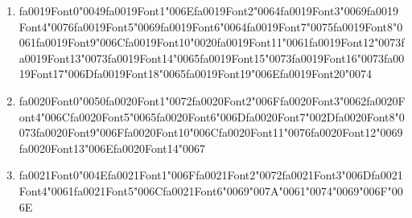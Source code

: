 \documentclass[12pt]{article}
\begin{document}
\begin{enumerate}[label=\arabic*.]
\begin{enumerate}[label=(\alph*)]
    \item {\csname fa0019Font0\endcsname\char"0049}{\csname fa0019Font1\endcsname\char"006E}{\csname fa0019Font2\endcsname\char"0064}{\csname fa0019Font3\endcsname\char"0069}{\csname fa0019Font4\endcsname\char"0076}{\csname fa0019Font5\endcsname\char"0069}{\csname fa0019Font6\endcsname\char"0064}{\csname fa0019Font7\endcsname\char"0075}{\csname fa0019Font8\endcsname\char"0061}{\csname fa0019Font9\endcsname\char"006C}{\csname fa0019Font10\endcsname\char"0020}{\csname fa0019Font11\endcsname\char"0061}{\csname fa0019Font12\endcsname\char"0073}{\csname fa0019Font13\endcsname\char"0073}{\csname fa0019Font14\endcsname\char"0065}{\csname fa0019Font15\endcsname\char"0073}{\csname fa0019Font16\endcsname\char"0073}{\csname fa0019Font17\endcsname\char"006D}{\csname fa0019Font18\endcsname\char"0065}{\csname fa0019Font19\endcsname\char"006E}{\csname fa0019Font20\endcsname\char"0074}
    \item {\csname fa0020Font0\endcsname\char"0050}{\csname fa0020Font1\endcsname\char"0072}{\csname fa0020Font2\endcsname\char"006F}{\csname fa0020Font3\endcsname\char"0062}{\csname fa0020Font4\endcsname\char"006C}{\csname fa0020Font5\endcsname\char"0065}{\csname fa0020Font6\endcsname\char"006D}{\csname fa0020Font7\endcsname\char"002D}{\csname fa0020Font8\endcsname\char"0073}{\csname fa0020Font9\endcsname\char"006F}{\csname fa0020Font10\endcsname\char"006C}{\csname fa0020Font11\endcsname\char"0076}{\csname fa0020Font12\endcsname\char"0069}{\csname fa0020Font13\endcsname\char"006E}{\csname fa0020Font14\endcsname\char"0067}
    \item {\csname fa0021Font0\endcsname\char"004E}{\csname fa0021Font1\endcsname\char"006F}{\csname fa0021Font2\endcsname\char"0072}{\csname fa0021Font3\endcsname\char"006D}{\csname fa0021Font4\endcsname\char"0061}{\csname fa0021Font5\endcsname\char"006C}{\csname fa0021Font6\endcsname\char"0069}{\char"007A}{\char"0061}{\char"0074}{\char"0069}{\char"006F}{\char"006E}
\end{enumerate}
\end{enumerate}
\end{document}

